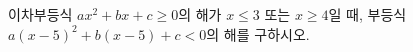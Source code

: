 \hspace*{2mm}\begin{minipage}[t]{\dimexpr\linewidth-2mm\relax}\vspace{0pt}
이차부등식 $ax^2+bx+c\ge 0$의 해가 $x\le 3$ 또는 $x\ge 4$일 때, 부등식 $a(x-5)^2+b(x-5)+c<0$의 해를 구하시오. \end{minipage}
